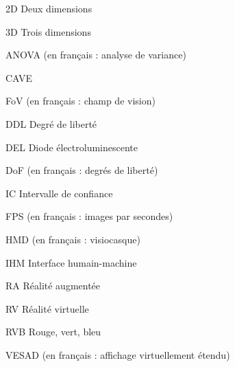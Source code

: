 \begin{listofabbr}[3cm]
  \item[2D] Deux dimensions
  \item[3D] Trois dimensions
  \item[ANOVA]  (en français : analyse de variance)
  \item[CAVE] 
  \item[FoV]  (en français : champ de vision)
  \item[DDL] Degré de liberté
  \item[DEL] Diode électroluminescente
  \item[DoF]  (en français : degrés de liberté)
  \item[IC] Intervalle de confiance
  \item[FPS]  (en français : images par secondes)
  \item[HMD]  (en français : visiocasque)
  \item[IHM] Interface humain-machine
  \item[RA] Réalité augmentée
  \item[RV] Réalité virtuelle
  \item[RVB] Rouge, vert, bleu
  \item[VESAD]  (en français : affichage virtuellement étendu)
\end{listofabbr}